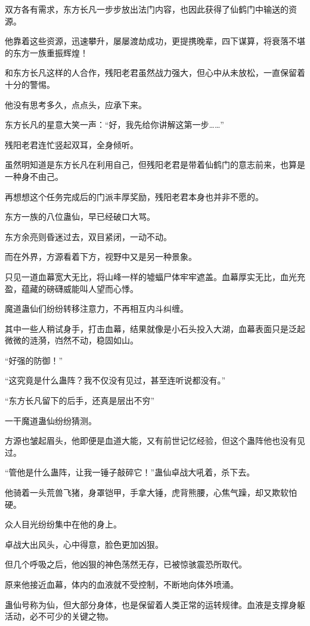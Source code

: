 \begin{this_body}
双方各有需求，东方长凡一步步放出法门内容，也因此获得了仙鹤门中输送的资源。

他靠着这些资源，迅速攀升，屡屡渡劫成功，更提携晚辈，四下谋算，将衰落不堪的东方一族重振辉煌！

和东方长凡这样的人合作，残阳老君虽然战力强大，但心中从未放松，一直保留着十分的警惕。

他没有思考多久，点点头，应承下来。

东方长凡的星意大笑一声：“好，我先给你讲解这第一步……”

残阳老君连忙竖起双耳，全身倾听。

虽然明知道是东方长凡在利用自己，但残阳老君是带着仙鹤门的意志前来，也算是一种身不由己。

再想想这个任务完成后的门派丰厚奖励，残阳老君本身也并非不愿的。

东方一族的八位蛊仙，早已经破口大骂。

东方余亮则昏迷过去，双目紧闭，一动不动。

而在外界，方源看着下方，视野中又是另一种景象。

只见一道血幕宽大无比，将山峰一样的墟蝠尸体牢牢遮盖。血幕厚实无比，血光充盈，蕴藏的磅礴威能叫人望而心悸。

魔道蛊仙们纷纷转移注意力，不再相互内斗纠缠。

其中一些人稍试身手，打击血幕，结果就像是小石头投入大湖，血幕表面只是泛起微微的涟漪，岿然不动，稳固如山。

“好强的防御！”

“这究竟是什么蛊阵？我不仅没有见过，甚至连听说都没有。”

“东方长凡留下的后手，还真是层出不穷”

一干魔道蛊仙纷纷猜测。

方源也皱起眉头，他即便是血道大能，又有前世记忆经验，但这个蛊阵他也没有见过。

“管他是什么蛊阵，让我一锤子敲碎它！”蛊仙卓战大吼着，杀下去。

他骑着一头荒兽飞猪，身罩铠甲，手拿大锤，虎背熊腰，心焦气躁，却又欺软怕硬。

众人目光纷纷集中在他的身上。

卓战大出风头，心中得意，脸色更加凶狠。

但几个呼吸之后，他凶狠的神色荡然无存，已被惊骇震恐所取代。

原来他接近血幕，体内的血液就不受控制，不断地向体外喷涌。

蛊仙号称为仙，但大部分身体，也是保留着人类正常的运转规律。血液是支撑身躯活动，必不可少的关键之物。


\end{this_body}
